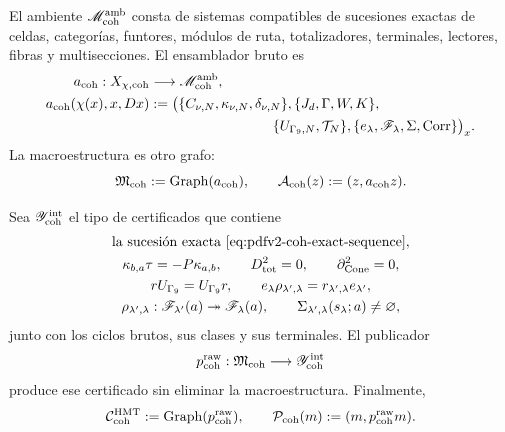 El ambiente \(\mathscr M_{\rm coh}^{\rm amb}\) consta de sistemas
compatibles de sucesiones exactas de celdas, categorías, funtores, módulos de
ruta, totalizadores, terminales, lectores, fibras y multisecciones. El
ensamblador bruto es
\begin{equation}\label{eq:pdfv2-coh-assembler}
 \begin{aligned}
 a_{\rm coh}:X_{\chi,{\rm coh}}&\longrightarrow
 \mathscr M_{\rm coh}^{\rm amb},\\
 a_{\rm coh}(\chi(x),x,Dx)
 &:={}
 \bigl(
 \{C_{\nu,N},\kappa_{\nu,N},\delta_{\nu,N}\},
 \{J_d,\Gamma,W,K\},\\
 &\hspace{31mm}
 \{U_{\Gamma_9,N},\mathcal T_N\},
 \{e_\lambda,\mathscr F_\lambda,\Sigma,\operatorname{Corr}\}
 \bigr)_x.
 \end{aligned}
\end{equation}
La macroestructura es otro grafo:
\begin{equation}\label{eq:pdfv2-coh-macro-graph}
 \mathfrak M_{\rm coh}:=\operatorname{Graph}(a_{\rm coh}),
 \qquad
 \mathcal A_{\rm coh}(z):=(z,a_{\rm coh}z).
\end{equation}

Sea \(\mathscr Y_{\rm coh}^{\rm int}\) el tipo de certificados que contiene
\begin{equation}\label{eq:pdfv2-coh-certificate-list}
 \begin{gathered}
 \text{la sucesión exacta \eqref{eq:pdfv2-coh-exact-sequence}},\\
 \kappa_{b,a}\tau=-P\kappa_{a,b},
 \qquad D_{\rm tot}^2=0,
 \qquad\partial_{\rm Cone}^2=0,\\
 rU_{\Gamma_9}=U_{\Gamma_9}r,
 \qquad
 e_\lambda\rho_{\lambda',\lambda}
 =r_{\lambda',\lambda}e_{\lambda'},\\
 \rho_{\lambda',\lambda}:\mathscr F_{\lambda'}(a)
 \twoheadrightarrow\mathscr F_\lambda(a),
 \qquad
 \Sigma_{\lambda',\lambda}(s_\lambda;a)\neq\varnothing,
 \end{gathered}
\end{equation}
junto con los ciclos brutos, sus clases y sus terminales. El publicador
\begin{equation}\label{eq:pdfv2-coh-publisher}
 p_{\rm coh}^{\rm raw}:\mathfrak M_{\rm coh}
 \longrightarrow\mathscr Y_{\rm coh}^{\rm int}
\end{equation}
produce ese certificado sin eliminar la macroestructura. Finalmente,
\begin{equation}\label{eq:pdfv2-coh-output-graph}
 \mathcal C_{\rm coh}^{\rm HMT}
 :=\operatorname{Graph}(p_{\rm coh}^{\rm raw}),
 \qquad
 \mathcal P_{\rm coh}(m):=(m,p_{\rm coh}^{\rm raw}m).
\end{equation}


